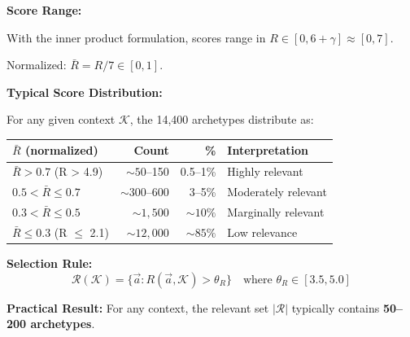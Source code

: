\begin{tcolorbox}[colback=green!5!white, colframe=green!75!black,
    title=\textbf{Result: Score Distribution and Selection}]

\textbf{Score Range:}

With the inner product formulation, scores range in $R \in [0, 6 + \gamma] \approx [0, 7]$.

Normalized: $\bar{R} = R/7 \in [0, 1]$.

\medskip
\textbf{Typical Score Distribution:}

For any given context $\mathcal{K}$, the 14,400 archetypes distribute as:

\begin{center}
\begin{tabular}{@{}lrrl@{}}
\toprule
\textbf{$\bar{R}$ (normalized)} & \textbf{Count} & \textbf{\%} & \textbf{Interpretation} \\
\midrule
$\bar{R} > 0.7$ (R > 4.9) & $\sim 50$--150 & 0.5--1\% & Highly relevant \\
$0.5 < \bar{R} \leq 0.7$ & $\sim 300$--600 & 3--5\% & Moderately relevant \\
$0.3 < \bar{R} \leq 0.5$ & $\sim 1{,}500$ & $\sim 10\%$ & Marginally relevant \\
$\bar{R} \leq 0.3$ (R $\leq$ 2.1) & $\sim 12{,}000$ & $\sim 85\%$ & Low relevance \\
\bottomrule
\end{tabular}
\end{center}

\textbf{Selection Rule:}
\begin{equation}
\mathcal{R}(\mathcal{K}) = \{\vec{a} : R(\vec{a}, \mathcal{K}) > \theta_R\} \quad \text{where } \theta_R \in [3.5, 5.0]
\end{equation}

\textbf{Practical Result:} For any context, the relevant set $|\mathcal{R}|$ typically contains \textbf{50--200 archetypes}.

\end{tcolorbox}

